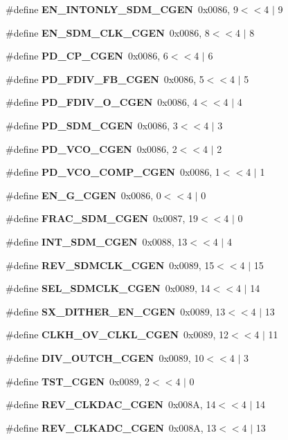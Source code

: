 \begin{DoxyCompactItemize}
\item 
\#define {\bf E\+N\+\_\+\+I\+N\+T\+O\+N\+L\+Y\+\_\+\+S\+D\+M\+\_\+\+C\+G\+EN}~0x0086, 9$<$$<$4 $\vert$  9
\item 
\#define {\bf E\+N\+\_\+\+S\+D\+M\+\_\+\+C\+L\+K\+\_\+\+C\+G\+EN}~0x0086, 8$<$$<$4 $\vert$  8
\item 
\#define {\bf P\+D\+\_\+\+C\+P\+\_\+\+C\+G\+EN}~0x0086, 6$<$$<$4 $\vert$  6
\item 
\#define {\bf P\+D\+\_\+\+F\+D\+I\+V\+\_\+\+F\+B\+\_\+\+C\+G\+EN}~0x0086, 5$<$$<$4 $\vert$  5
\item 
\#define {\bf P\+D\+\_\+\+F\+D\+I\+V\+\_\+\+O\+\_\+\+C\+G\+EN}~0x0086, 4$<$$<$4 $\vert$  4
\item 
\#define {\bf P\+D\+\_\+\+S\+D\+M\+\_\+\+C\+G\+EN}~0x0086, 3$<$$<$4 $\vert$  3
\item 
\#define {\bf P\+D\+\_\+\+V\+C\+O\+\_\+\+C\+G\+EN}~0x0086, 2$<$$<$4 $\vert$  2
\item 
\#define {\bf P\+D\+\_\+\+V\+C\+O\+\_\+\+C\+O\+M\+P\+\_\+\+C\+G\+EN}~0x0086, 1$<$$<$4 $\vert$  1
\item 
\#define {\bf E\+N\+\_\+\+G\+\_\+\+C\+G\+EN}~0x0086, 0$<$$<$4 $\vert$  0
\item 
\#define {\bf F\+R\+A\+C\+\_\+\+S\+D\+M\+\_\+\+C\+G\+EN}~0x0087, 19$<$$<$4 $\vert$  0
\item 
\#define {\bf I\+N\+T\+\_\+\+S\+D\+M\+\_\+\+C\+G\+EN}~0x0088, 13$<$$<$4 $\vert$  4
\item 
\#define {\bf R\+E\+V\+\_\+\+S\+D\+M\+C\+L\+K\+\_\+\+C\+G\+EN}~0x0089, 15$<$$<$4 $\vert$  15
\item 
\#define {\bf S\+E\+L\+\_\+\+S\+D\+M\+C\+L\+K\+\_\+\+C\+G\+EN}~0x0089, 14$<$$<$4 $\vert$  14
\item 
\#define {\bf S\+X\+\_\+\+D\+I\+T\+H\+E\+R\+\_\+\+E\+N\+\_\+\+C\+G\+EN}~0x0089, 13$<$$<$4 $\vert$  13
\item 
\#define {\bf C\+L\+K\+H\+\_\+\+O\+V\+\_\+\+C\+L\+K\+L\+\_\+\+C\+G\+EN}~0x0089, 12$<$$<$4 $\vert$  11
\item 
\#define {\bf D\+I\+V\+\_\+\+O\+U\+T\+C\+H\+\_\+\+C\+G\+EN}~0x0089, 10$<$$<$4 $\vert$  3
\item 
\#define {\bf T\+S\+T\+\_\+\+C\+G\+EN}~0x0089, 2$<$$<$4 $\vert$  0
\item 
\#define {\bf R\+E\+V\+\_\+\+C\+L\+K\+D\+A\+C\+\_\+\+C\+G\+EN}~0x008\+A, 14$<$$<$4 $\vert$  14
\item 
\#define {\bf R\+E\+V\+\_\+\+C\+L\+K\+A\+D\+C\+\_\+\+C\+G\+EN}~0x008\+A, 13$<$$<$4 $\vert$  13
\item 
$$
\end{DoxyCompactItemize}
